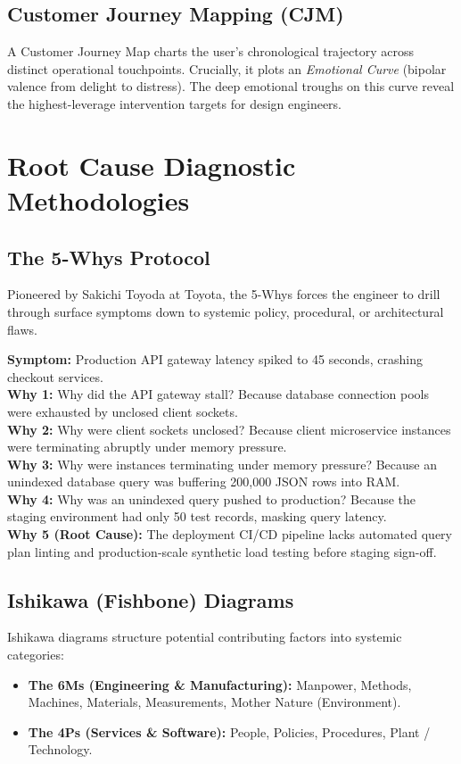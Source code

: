 \subsection{Customer Journey Mapping (CJM)}
A Customer Journey Map charts the user's chronological trajectory across distinct operational touchpoints. Crucially, it plots an \textit{Emotional Curve} (bipolar valence from delight to distress). The deep emotional troughs on this curve reveal the highest-leverage intervention targets for design engineers.

\section{Root Cause Diagnostic Methodologies}

\subsection{The 5-Whys Protocol}
Pioneered by Sakichi Toyoda at Toyota, the 5-Whys forces the engineer to drill through surface symptoms down to systemic policy, procedural, or architectural flaws.

\begin{casestudy}
\textbf{Symptom:} Production API gateway latency spiked to 45 seconds, crashing checkout services.\\
\textbf{Why 1:} Why did the API gateway stall? Because database connection pools were exhausted by unclosed client sockets.\\
\textbf{Why 2:} Why were client sockets unclosed? Because client microservice instances were terminating abruptly under memory pressure.\\
\textbf{Why 3:} Why were instances terminating under memory pressure? Because an unindexed database query was buffering 200,000 JSON rows into RAM.\\
\textbf{Why 4:} Why was an unindexed query pushed to production? Because the staging environment had only 50 test records, masking query latency.\\
\textbf{Why 5 (Root Cause):} The deployment CI/CD pipeline lacks automated query plan linting and production-scale synthetic load testing before staging sign-off.
\end{casestudy}

\subsection{Ishikawa (Fishbone) Diagrams}
Ishikawa diagrams structure potential contributing factors into systemic categories:
\begin{itemize}
    \item \textbf{The 6Ms (Engineering \& Manufacturing):} Manpower, Methods, Machines, Materials, Measurements, Mother Nature (Environment).
    \item \textbf{The 4Ps (Services \& Software):} People, Policies, Procedures, Plant / Technology.
\end{itemize}

